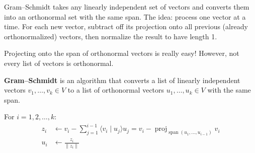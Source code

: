 \documentclass[11pt]{article}
\theoremstyle{definition}
\theoremstyle{plain}
\theoremstyle{remark}
\DeclareMathOperator{\spn}{span}
\DeclareMathOperator{\proj}{proj}
\begin{document}
\begin{intuitionbox}
Gram--Schmidt takes any linearly independent set of vectors and converts them into an orthonormal set with the same span. The idea: process one vector at a time. For each new vector, subtract off its projection onto all previous (already orthonormalized) vectors, then normalize the result to have length 1.
\end{intuitionbox}

Projecting onto the span of orthonormal vectors is really easy! However, not every list of vectors is orthonormal.

\textbf{Gram--Schmidt} is an algorithm that converts a list of linearly independent vectors $v_1, \ldots, v_k \in V$ to a list of orthonormal vectors $u_1, \ldots, u_k \in V$ with the same span.

\medskip
For $i = 1, 2, \ldots, k$:
\begin{align*}
z_i &\leftarrow v_i - \sum_{j=1}^{i-1} \langle v_i \mid u_j \rangle u_j = v_i - \proj_{\spn(u_1, \ldots, u_{i-1})} v_i \\[6pt]
u_i &\leftarrow \frac{z_i}{\|z_i\|}
\end{align*}
\end{document}

